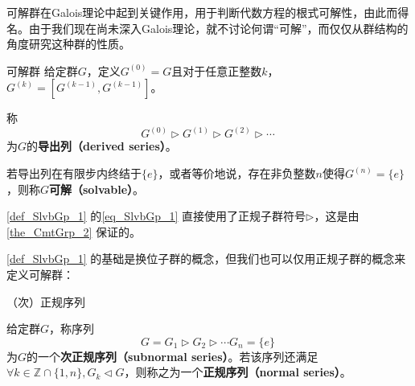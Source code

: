 



可解群在Galois理论中起到关键作用，用于判断代数方程的根式可解性，由此而得名。由于我们现在尚未深入Galois理论，就不讨论何谓“可解”，而仅仅从群结构的角度研究这种群的性质。


\begin{definition}{可解群}\label{def_SlvbGp_1}
给定群$G$，定义$G^{(0)}=G$且对于任意正整数$k$，$G^{(k)}=[G^{(k-1)}, G^{(k-1)}]$。

称
\begin{equation}\label{eq_SlvbGp_1}
G^{(0)}\rhd G^{(1)}\rhd G^{(2)}\rhd \cdots~
\end{equation}
为$G$的\textbf{导出列（derived series）}。

若导出列在有限步内终结于$\{e\}$，或者等价地说，存在非负整数$n$使得$G^{(n)}=\{e\}$，则称$G$\textbf{可解（solvable）}。

\end{definition}


\autoref{def_SlvbGp_1} 的\autoref{eq_SlvbGp_1} 直接使用了正规子群符号$\rhd$，这是由\autoref{the_CmtGrp_2} 保证的。



\autoref{def_SlvbGp_1} 的基础是换位子群的概念，但我们也可以仅用正规子群的概念来定义可解群：



\begin{definition}{（次）正规序列}

给定群$G$，称序列
\begin{equation}
G=G_1\rhd G_2\rhd\cdots G_n=\{e\}~
\end{equation}
为$G$的一个\textbf{次正规序列（subnormal series）}。若该序列还满足$\forall k\in \mathbb{Z}\cap\{1, n\}, G_k\lhd G$，则称之为一个\textbf{正规序列（normal series）}。

\end{definition}




































